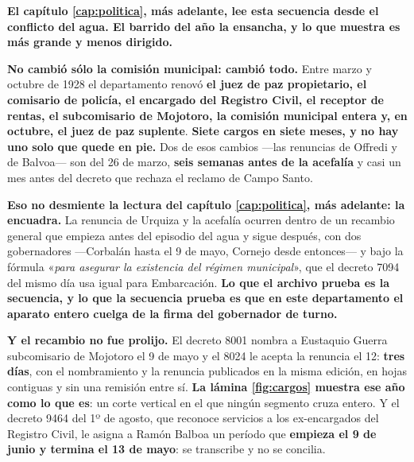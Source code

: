 \begin{cautela}
\textbf{El capítulo \ref{cap:politica}, más adelante, lee esta secuencia desde el conflicto del agua. El barrido
del año la ensancha, y lo que muestra es más grande y menos dirigido.}

\textbf{No cambió sólo la comisión municipal: cambió todo.} Entre marzo y octubre de 1928 el
departamento renovó \textbf{el juez de paz propietario, el comisario de policía, el encargado del
Registro Civil, el receptor de rentas, el subcomisario de Mojotoro, la comisión municipal entera
y, en octubre, el juez de paz suplente}. \textbf{Siete cargos en siete meses, y no hay uno solo
que quede en pie.} Dos de esos cambios ---las renuncias de Offredi y de Balvoa--- son del 26 de
marzo, \textbf{seis semanas antes de la acefalía} y casi un mes antes del decreto que rechaza el
reclamo de Campo Santo.

\textbf{Eso no desmiente la lectura del capítulo \ref{cap:politica}, más adelante: la encuadra.} La renuncia de
Urquiza y la acefalía ocurren dentro de un recambio general que empieza antes del episodio del
agua y sigue después, con dos gobernadores ---Corbalán hasta el 9 de mayo, Cornejo desde
entonces--- y bajo la fórmula «\textit{para asegurar la existencia del régimen municipal}», que el
decreto 7094 del mismo día usa igual para Embarcación. \textbf{Lo que el archivo prueba es la
secuencia, y lo que la secuencia prueba es que en este departamento el aparato entero cuelga de
la firma del gobernador de turno.}

\textbf{Y el recambio no fue prolijo.} El decreto 8001 nombra a Eustaquio Guerra subcomisario de
Mojotoro el 9 de mayo y el 8024 le acepta la renuncia el 12: \textbf{tres días}, con el
nombramiento y la renuncia publicados en la misma edición, en hojas contiguas y sin una remisión
entre sí. \textbf{La lámina \ref{fig:cargos} muestra ese año como lo que es}: un corte vertical
en el que ningún segmento cruza entero. Y el decreto 9464 del 1º de agosto, que reconoce servicios a los ex-encargados del
Registro Civil, le asigna a Ramón Balboa un período que \textbf{empieza el 9 de junio y termina el
13 de mayo}: se transcribe y no se concilia.
\end{cautela}

